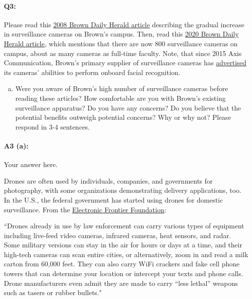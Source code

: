 \pagebreak
\paragraph{Q3:}
Please read this \href{https://www.browndailyherald.com/2008/01/10/surveillance-cameras-on-campus-triple/}{2008 Brown Daily Herald article} describing the gradual increase in surveillance cameras on Brown’s campus. Then, read this \href{https://www.browndailyherald.com/2020/02/21/cameras-installed-hegeman-hall/}{2020 Brown Daily Herald article}, which mentions that there are now 800 surveillance cameras on campus, about as many cameras as full-time faculty. Note, that since 2015 Axis Communication, Brown’s primary supplier of surveillance cameras has \href{https://www.axis.com/customer-story/3767}{advertised} its cameras’ abilities to perform onboard facial recognition.

\begin{enumerate}[(a)]
    \item Were you aware of Brown’s high number of surveillance cameras before reading these articles? How comfortable are you with Brown’s existing surveillance apparatus? Do you have any concerns? Do you believe that the potential benefits outweigh potential concerns? Why or why not? Please respond in 3-4 sentences.
\end{enumerate}

\paragraph{A3 (a):} Your answer here.









\newpage
Drones are often used by individuals, companies, and governments for photography, with some organizations demonstrating delivery applications, too. In the U.S., the federal government has started using drones for domestic surveillance. From the \href{https://www.eff.org/issues/surveillance-drones}{Electronic Frontier Foundation}:

``Drones already in use by law enforcement can carry various types of equipment including live-feed video cameras, infrared cameras, heat sensors, and radar. Some military versions can stay in the air for hours or days at a time, and their high-tech cameras can scan entire cities, or alternatively, zoom in and read a milk carton from 60,000 feet. They can also carry WiFi crackers and fake cell phone towers that can determine your location or intercept your texts and phone calls. Drone manufacturers even admit they are made to carry “less lethal” weapons such as tasers or rubber bullets."

